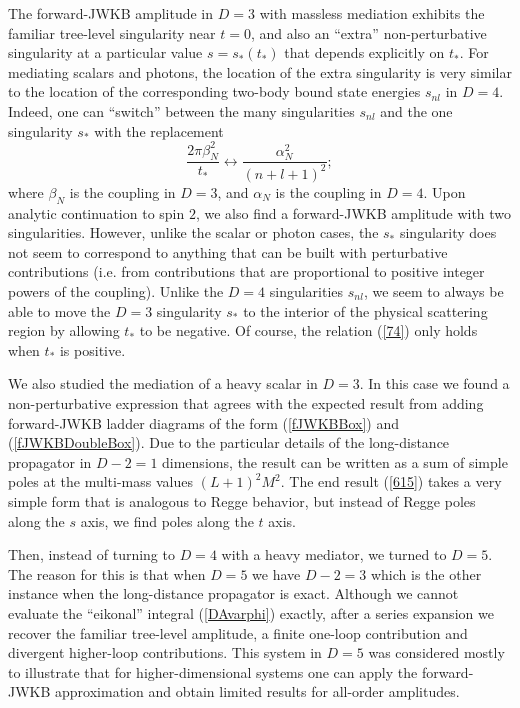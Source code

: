 The forward-JWKB amplitude in $D = 3$ with massless mediation exhibits the familiar tree-level singularity near $t = 0$, and also an ``extra'' non-perturbative singularity at a particular value $s = s_{*}(t_{*})$ that depends explicitly on $t_{*}$. For mediating scalars and photons, the location of the extra singularity is very similar to the location of the corresponding two-body bound state energies $s_{nl}$ in $D = 4$. Indeed, one can ``switch'' between the many singularities $s_{nl}$ and the one singularity $s_{*}$ with the replacement
\begin{equation}
	\frac{2 \pi \beta^{2}_{N}}{t_{*}} \longleftrightarrow \frac{\alpha^{2}_{N}}{(n + l + 1)^{2}};
	\label{74}
\end{equation}
where $\beta_{N}$ is the coupling in $D = 3$, and $\alpha_{N}$ is the coupling in $D = 4$. Upon analytic continuation to spin $2$, we also find a forward-JWKB amplitude with two singularities. However, unlike the scalar or photon cases, the $s_{*}$ singularity does not seem to correspond to anything that can be built with perturbative contributions (i.e. from contributions that are proportional to positive integer powers of the coupling). Unlike the $D = 4$ singularities $s_{nl}$, we seem to always be able to move the $D = 3$ singularity $s_{*}$ to the interior of the physical scattering region by allowing $t_{*}$ to be negative. Of course, the relation (\ref{74}) only holds when $t_{*}$ is positive.

We also studied the mediation of a heavy scalar in $D = 3$. In this case we found a non-perturbative expression that agrees with the expected result from adding forward-JWKB ladder diagrams of the form (\ref{fJWKBBox}) and (\ref{fJWKBDoubleBox}). Due to the particular details of the long-distance propagator in $D - 2 = 1$ dimensions, the result can be written as a sum of simple poles at the multi-mass values $(L+1)^{2}M^{2}$. The end result (\ref{615}) takes a very simple form that is analogous to Regge behavior, but instead of Regge poles along the $s$ axis, we find poles along the $t$ axis.

Then, instead of turning to $D = 4$ with a heavy mediator, we turned to $D = 5$. The reason for this is that when $D = 5$ we have $D - 2 = 3$ which is the other instance when the long-distance propagator is exact. Although we cannot evaluate the ``eikonal'' integral (\ref{DAvarphi}) exactly, after a series expansion we recover the familiar tree-level amplitude, a finite one-loop contribution and divergent higher-loop contributions. This system in $D = 5$ was considered mostly to illustrate that for higher-dimensional systems one can apply the forward-JWKB approximation and obtain limited results for all-order amplitudes.

